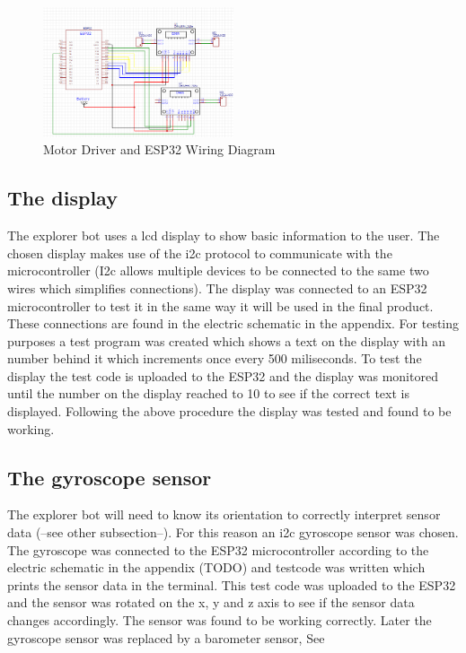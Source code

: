 \begin{figure}[h]
    \centering
    \caption{Motor Driver and ESP32 Wiring Diagram}
    \label{fig:motoropstelling}
    \includegraphics[width=0.5\textwidth]{motoropstelling.png}
\end{figure}



\subsection{The display}
The explorer bot uses a lcd display to show basic information to the 
user. The chosen display makes use of the i2c protocol to communicate 
with the microcontroller (I2c allows multiple devices to be connected to
the same two wires which simplifies connections). 
The display was connected to an ESP32 microcontroller to test it in the 
same way it will be used in the final product. These connections are found 
in the electric schematic in the appendix. For testing purposes a test 
program was 
created which shows a text on the display with an number behind it which 
increments once every 500 miliseconds.
To test the display the test code is uploaded to the ESP32 and the display was
monitored until the number on the display reached to 10 to see if the correct text is displayed.  %
Following the above procedure the display was tested and found to be working. 

\subsection{The gyroscope sensor}
The explorer bot will need to know its orientation to correctly interpret 
sensor data (--see other subsection--). For this reason an i2c gyroscope 
sensor was chosen. The gyroscope was connected to the ESP32 microcontroller 
according to the electric schematic in the appendix (TODO) and testcode was 
written which prints the sensor data in the terminal. This test code was 
uploaded to the ESP32 and the sensor was rotated on the x, y and z axis to 
see if the sensor data changes accordingly. The sensor was found to 
be working correctly.
Later the gyroscope sensor was replaced by a barometer sensor, See

